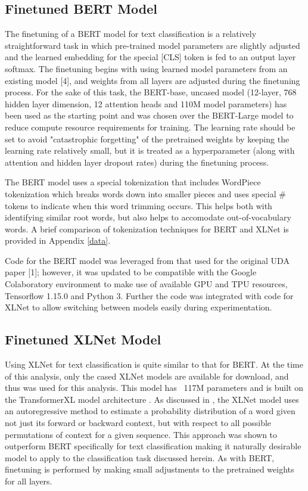 \documentclass[twoside,twocolumn,10pt]{article}
\begin{document}
\subsection{Finetuned BERT Model}

The finetuning of a BERT model for text classification is a relatively straightforward task in which pre-trained model parameters are slightly adjusted and the learned embedding for the special [CLS] token is fed to an output layer softmax. The finetuning begins with using learned model parameters from an existing model [4], and weights from all layers are adjusted during the finetuning process. For the sake of this task, the BERT-base, uncased model (12-layer, 768 hidden layer dimension, 12 attention heads and 110M model parameters) has been used as the starting point and was chosen over the BERT-Large model to reduce compute resource requirements for training. The learning rate should be set to avoid "catastrophic forgetting" of the pretrained weights by keeping the learning rate relatively small, but it is treated as a hyperparameter (along with attention and hidden layer dropout rates) during the finetuning process. 

The BERT model uses a special tokenization that includes WordPiece tokenization \cite{Schuster and Nakajima:2012} which breaks words down into smaller pieces and uses special \# tokens to indicate when this word trimming occurs. This helps both with identifying similar root words, but also helps to accomodate out-of-vocabulary words. A brief comparison of tokenization techniques for BERT and XLNet is provided in Appendix \ref{data}. 

Code for the BERT model was leveraged from that used for the original UDA paper [1]; however, it was updated to be compatible with the Google Colaboratory environment to make use of available GPU and TPU resources, Tensorflow 1.15.0 and Python 3. Further the code was integrated with code for XLNet to allow switching between models easily during experimentation. 
\subsection{Finetuned XLNet Model}
Using XLNet for text classification is quite similar to that for BERT. At the time of this analysis, only the cased XLNet models are available for download, and thus was used for this analysis. This model has ~117M parameters and is built on the TransformerXL model architecture \cite{Dai:2019}. As discussed in \cite{Yang:2019}, the XLNet model uses an autoregressive method to estimate a probability distribution of a word given not just its forward or backward context, but with respect to all possible permutations of context for a given sequence. This approach was shown to outperform BERT specifically for text classification making it naturally desirable model to apply to the classification task discussed herein. As with BERT, finetuning is performed by making small adjustments to the pretrained weights for all layers.
\end{document}
